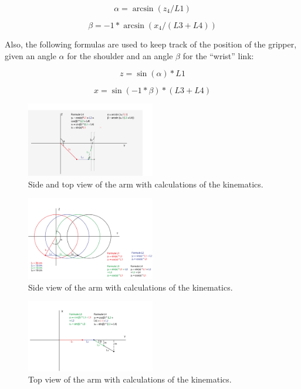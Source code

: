 \documentclass[project_eva.tex]{subfiles}
\begin{document}
\begin{equation*}
\alpha = \arcsin(z_4/L1)
\end{equation*}

\begin{equation*}
\beta = -1 * \arcsin(x_4/(L3 + L4))
\end{equation*}

Also, the following formulas are used to keep track of the position of the gripper, given an angle $\alpha$ for the 
shoulder and an angle $\beta$ for the ``wrist'' link:

\begin{equation*}
z = \sin(\alpha)*L1
\end{equation*}

\begin{equation*}
x = \sin(-1 * \beta)*(L3 + L4)
\end{equation*}

\begin{figure}[h]
	\centering
	\mbox{\includegraphics[width=0.5\textwidth]{Images/3d_zijenbovenaanzicht.png}}
	\caption{Side and top view of the arm with calculations of the kinematics.}
	\label{fig:IK0}
\end{figure}

\begin{figure}[h]
	\centering
	\mbox{\includegraphics[width=0.5\textwidth]{Images/2d_zijaanzicht.png}}
	\caption{Side view of the arm with calculations of the kinematics.}
	\label{fig:IK2}
\end{figure}

\begin{figure}[h!]
	\centering
	\mbox{\includegraphics[width=0.5\textwidth]{Images/2d_bovenaanzicht.png}}
	\caption{Top view of the arm with calculations of the kinematics.}
	\label{fig:IK1}
\end{figure}
\end{document}
